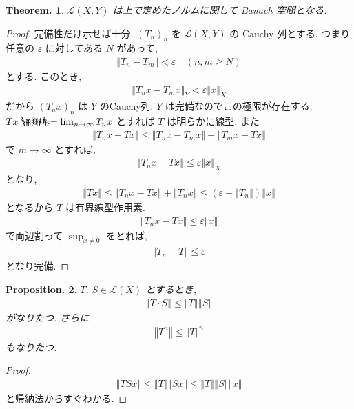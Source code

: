 \documentclass[openany, a4paper, oneside]{jsbook}
\makeatletter
\newcommand*{\defeq}{\mathrel{\rlap{%
\raisebox{0.3ex}{$\m@th\cdot$}}%
\raisebox{-0.3ex}{$\m@th\cdot$}}%
=}
\theoremstyle{break}
\theoremstyle{breakdefn}
\newtheorem{thm}{Theorem.}[section]
\newtheorem{prop}[thm]{Proposition.}
\newcommand{\norm}[1]{\left\Vert#1\right\Vert}
\newcommand{\rbk}[1]{\left (#1\right)}
\newcommand{\calL}{\mathcal{L}}
\makeatother
\begin{document}
\begin{thm}
$\calL (X, Y)$ は上で定めたノルムに関して Banach 空間となる.
\end{thm}
\begin{proof}
完備性だけ示せば十分.
$(T_n)_n$ を $\calL (X, Y)$ の Cauchy 列とする.
つまり任意の $\varepsilon$ に対してある $N$ があって,
\begin{align}
 \norm{T_n - T_m}
 <
 \varepsilon \quad (n, m \geq N)
\end{align}
とする.
このとき,
\begin{align}
 \norm{T_n x - T_m x}_Y
 <
 \varepsilon \norm{x}_X
\end{align}
だから $(T_nx)_n$ は $Y$ のCauchy列.
$Y$ は完備なのでこの極限が存在する.
$Tx \defeq \lim_{n \to \infty} T_nx$ とすれば $T$ は明らかに線型.
また
\begin{align}
 \norm{T_n x - Tx}
 \leq
 \norm{T_n x - T_m x} + \norm{T_m x - T x}
\end{align}
で $m \to \infty$ とすれば,
\begin{align}
 \norm{T_n x - T x}
 \leq
 \varepsilon \norm{x}_X
\end{align}
となり,
\begin{align}
 \norm{Tx}
 \leq
 \norm{T_n x - T x} + \norm{T_n x}
 \leq
 \rbk{\varepsilon + \norm{T_n}} \norm{x}
\end{align}
となるから $T$ は有界線型作用素.
\begin{align}
 \norm{T_n x - Tx}
 \leq
 \varepsilon \norm{x}
\end{align}
で両辺割って $\sup_{x \neq 0}$ をとれば,
\begin{align}
 \norm{T_n - T}
 \leq
 \varepsilon
\end{align}
となり完備.
\end{proof}

\begin{prop}
$T$, $S \in \calL (X)$ とするとき,
\begin{align}
 \norm{T \cdot S}
 \leq
 \norm{T} \norm{S}
\end{align}
がなりたつ.
さらに
\begin{align}
 \norm{T^n}
 \leq
 \norm{T}^n
\end{align}
もなりたつ.
\end{prop}
\begin{proof}
\begin{align}
 \norm{TS x}
 \leq
 \norm{T} \norm{Sx}
 \leq
 \norm{T} \norm{S} \norm{x}
\end{align}
と帰納法からすぐわかる.
\end{proof}
\end{document}
